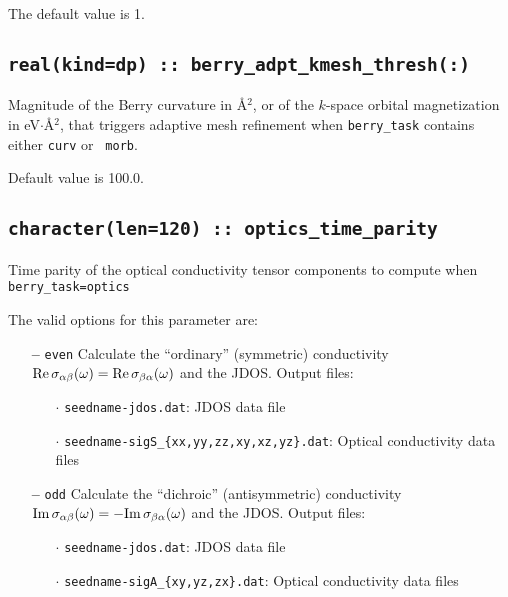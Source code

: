 The default value is 1.


\subsection[berry\_adpt\_kmesh\_thresh]{\tt real(kind=dp) :: berry\_adpt\_kmesh\_thresh(:)}

Magnitude of the Berry curvature in \AA$^2$, or of the $k$-space
orbital magnetization in eV$\cdot$\AA$^2$, that triggers adaptive mesh
refinement when {\tt berry\_task} contains either {\tt curv} or {\tt
  morb}.

Default value is 100.0.

\subsection[berry\_spectrum\_time\_parity]{\tt character(len=120) ::  optics\_time\_parity}
Time parity of the optical conductivity tensor components to compute
when {\tt berry\_task=optics}

The valid options for this parameter are:
\begin{itemize}

\item[{\bf --}] \verb#even# Calculate the ``ordinary'' (symmetric) conductivity
  ${\rm Re}\,\sigma_{\alpha\beta}(\omega)={\rm
    Re}\,\sigma_{\beta\alpha}(\omega)$ and the
  JDOS. Output files:

  \begin{itemize}

  \item[$\cdot$] {\tt seedname-jdos.dat}: JDOS data file

  \item[$\cdot$] {\tt seedname-sigS\_\{xx,yy,zz,xy,xz,yz\}.dat}:
    Optical conductivity data files

  \end{itemize}

\item[{\bf --}] \verb#odd# Calculate the ``dichroic'' (antisymmetric)
  conductivity ${\rm Im}\,\sigma_{\alpha\beta}(\omega)=-{\rm
    Im}\,\sigma_{\beta\alpha}(\omega)$ and the
  JDOS. Output files:

  \begin{itemize}

  \item[$\cdot$] {\tt seedname-jdos.dat}: JDOS data file

  \item[$\cdot$] {\tt seedname-sigA\_\{xy,yz,zx\}.dat}: Optical
    conductivity data files

  \end{itemize}


\end{itemize}


